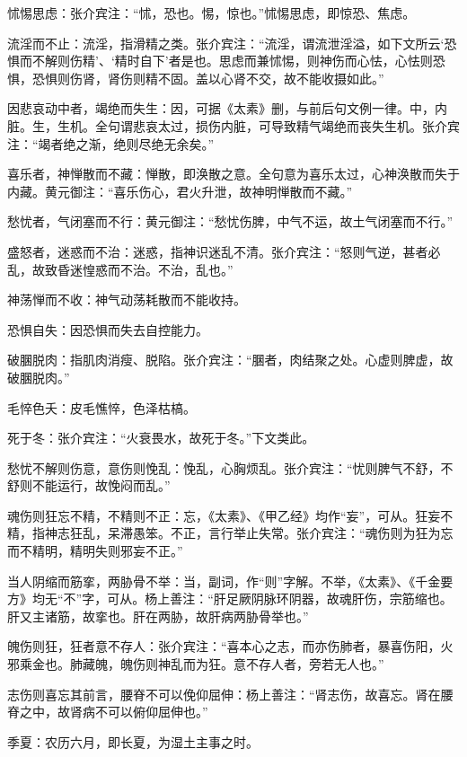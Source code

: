 \documentclass[12pt]{ctexbook}
\begin{document}

\begin{jiaozhu}
  \item 怵惕思虑：张介宾注：“怵，恐也。惕，惊也。”怵惕思虑，即惊恐、焦虑。
  \item 流淫而不止：流淫，指滑精之类。张介宾注：“流淫，谓流泄淫溢，如下文所云‘恐惧而不解则伤精’、‘精时自下’者是也。思虑而兼怵惕，则神伤而心怯，心怯则恐惧，恐惧则伤肾，肾伤则精不固。盖以心肾不交，故不能收摄如此。”
  \item 因悲哀动中者，竭绝而失生：因，可据《太素》删，与前后句文例一律。中，内脏。生，生机。全句谓悲哀太过，损伤内脏，可导致精气竭绝而丧失生机。张介宾注：“竭者绝之渐，绝则尽绝无余矣。”
  \item 喜乐者，神惮散而不藏：惮散，即涣散之意。全句意为喜乐太过，心神涣散而失于内藏。黄元御注：“喜乐伤心，君火升泄，故神明惮散而不藏。”
  \item 愁忧者，气闭塞而不行：黄元御注：“愁忧伤脾，中气不运，故土气闭塞而不行。”
  \item 盛怒者，迷惑而不治：迷惑，指神识迷乱不清。张介宾注：“怒则气逆，甚者必乱，故致昏迷惶惑而不治。不治，乱也。”
  \item 神荡惮而不收：神气动荡耗散而不能收持。
  \item 恐惧自失：因恐惧而失去自控能力。
  \item 破䐃脱肉：指肌肉消瘦、脱陷。张介宾注：“䐃者，肉结聚之处。心虚则脾虚，故破䐃脱肉。”
  \item 毛悴色夭：皮毛憔悴，色泽枯槁。
  \item 死于冬：张介宾注：“火衰畏水，故死于冬。”下文类此。
  \item 愁忧不解则伤意，意伤则悗乱：悗乱，心胸烦乱。张介宾注：“忧则脾气不舒，不舒则不能运行，故悗闷而乱。”
  \item 魂伤则狂忘不精，不精则不正：忘，《太素》、《甲乙经》均作“妄”，可从。狂妄不精，指神志狂乱，呆滞愚笨。不正，言行举止失常。张介宾注：“魂伤则为狂为忘而不精明，精明失则邪妄不正。”
  \item 当人阴缩而筋挛，两胁骨不举：当，副词，作“则”字解。不举，《太素》、《千金要方》均无“不”字，可从。杨上善注：“肝足厥阴脉环阴器，故魂肝伤，宗筋缩也。肝又主诸筋，故挛也。肝在两胁，故肝病两胁骨举也。”
  \item 魄伤则狂，狂者意不存人：张介宾注：“喜本心之志，而亦伤肺者，暴喜伤阳，火邪乘金也。肺藏魄，魄伤则神乱而为狂。意不存人者，旁若无人也。”
  \item 志伤则喜忘其前言，腰脊不可以俛仰屈伸：杨上善注：“肾志伤，故喜忘。肾在腰脊之中，故肾病不可以俯仰屈伸也。”
  \item 季夏：农历六月，即长夏，为湿土主事之时。

\end{jiaozhu}
\end{document}
